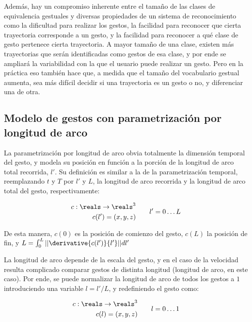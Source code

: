 Además, hay un compromiso inherente entre el tamaño de las clases de equivalencia gestuales y diversas propiedades de un sistema de reconocimiento como la dificultad para realizar los gestos, la facilidad para reconocer que cierta trayectoria corresponde a un gesto, y la facilidad para reconocer a qué clase de gesto pertenece cierta trayectoria. A mayor tamaño de una clase, existen más trayectorias que serán identificadas como gestos de esa clase, y por ende se ampliará la variabilidad con la que el usuario puede realizar un gesto. Pero en la práctica eso también hace que, a medida que el tamaño del vocabulario gestual aumenta, sea más difícil decidir si una trayectoria es un gesto o no, y diferenciar una de otra.



\subsection{Modelo de gestos con parametrización por longitud de arco}

La parametrización por longitud de arco obvia totalmente la dimensión temporal del gesto, y modela su posición en función a la porción de la longitud de arco total recorrida, $l'$. Su definición es similar a la de la parametrización temporal, reemplazando $t$ y $T$ por $l'$ y $L$, la longitud de arco recorrida y la longitud de arco total del gesto, respectivamente:

\begin{equation}
  \begin{split}
    c : \reals \rightarrow \reals^3 \\
    c(l')=(x,y,z)
  \end{split}
  \quad \quad
  \begin{split}
    l'=0 \dots L
  \end{split}
\end{equation} 

De esta manera, $c(0)$ es la posición de comienzo del gesto, $c(L)$ la posición de fin, y $L=\int_0^L || \derivative{c(l')}{l'}|| dl'$

La longitud de arco depende de la escala del gesto, y en el caso de la velocidad resulta complicado comparar gestos de distinta longitud (longitud de arco, en este caso). Por ende, se puede normalizar la longitud de arco de todos los gestos a $1$ introduciendo una variable $l=l'/L$, y redefiniendo el gesto como:

\begin{equation}
  \begin{split}
    c : \reals \rightarrow \reals^3 \\
    c(l)=(x,y,z)
  \end{split}
  \quad \quad
  \begin{split}
    l=0 \dots 1
  \end{split}
\end{equation} 

